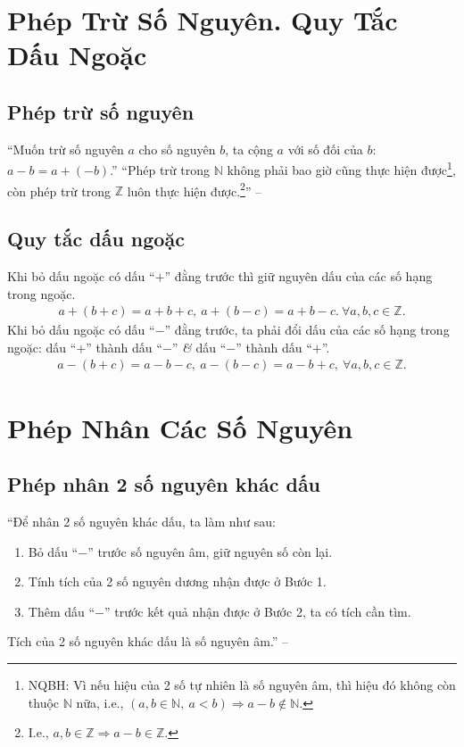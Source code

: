 \documentclass[oneside]{book}
\numberwithin{equation}{section}
\begin{document}
\section{Phép Trừ Số Nguyên. Quy Tắc Dấu Ngoặc}

\subsection{Phép trừ số nguyên}
``Muốn trừ số nguyên $a$ cho số nguyên $b$, ta cộng $a$ với số đối của $b$: $a - b = a + (-b)$.'' ``Phép trừ trong $\mathbb{N}$ không phải bao giờ cũng thực hiện được\footnote{NQBH: Vì nếu hiệu của 2 số tự nhiên là số nguyên âm, thì hiệu đó không còn thuộc $\mathbb{N}$ nữa, i.e., $(a,b\in\mathbb{N},\ a < b)\Rightarrow a - b\notin\mathbb{N}$.}, còn phép trừ trong $\mathbb{Z}$ luôn thực hiện được.\footnote{I.e., $a,b\in\mathbb{Z}\Rightarrow a - b\in\mathbb{Z}$.}'' -- \cite[p. 76]{Thai_Anh_Dat_Ha_Loan_Nam_Quang_Toan_6_tap_1}

\subsection{Quy tắc dấu ngoặc}
Khi bỏ dấu ngoặc có dấu ``$+$'' đằng trước thì giữ nguyên dấu của các số hạng trong ngoặc.
\begin{align*}
	a + (b + c) = a + b + c,\ a + (b - c) = a + b - c.\ \forall a,b,c\in\mathbb{Z}.
\end{align*}
Khi bỏ dấu ngoặc có dấu ``$-$'' đằng trước, ta phải đổi dấu của các số hạng trong ngoặc: dấu ``$+$'' thành dấu ``$-$'' \textit{\&} dấu ``$-$'' thành dấu ``$+$''.
\begin{align*}
	a - (b + c) = a - b - c,\ a - (b - c) = a - b + c,\ \forall a,b,c\in\mathbb{Z}.
\end{align*}

\section{Phép Nhân Các Số Nguyên}

\subsection{Phép nhân 2 số nguyên khác dấu}
``Để nhân 2 số nguyên khác dấu, ta làm như sau:
\begin{enumerate}
	\item Bỏ dấu ``$-$'' trước số nguyên âm, giữ nguyên số còn lại.
	\item Tính tích của 2 số nguyên dương nhận được ở Bước 1.
	\item Thêm dấu ``$-$'' trước kết quả nhận được ở Bước 2, ta có tích cần tìm.
\end{enumerate}
Tích của 2 số nguyên khác dấu là số nguyên âm.'' -- \cite[p. 80]{Thai_Anh_Dat_Ha_Loan_Nam_Quang_Toan_6_tap_1}
\end{document}
